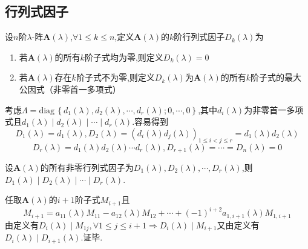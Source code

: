 \subsection{行列式因子}
\begin{formal}
\begin{definition}[行列式因子]\label{def:行列式因子}
    设$n$阶$\lambda$-阵$\bm{A}\left(\lambda\right)$,$\forall 1\leqslant k\leqslant n$,定义$\bm{A}\left(\lambda\right)$的$k$阶行列式因子$D_k\left(\lambda\right)$为
    \begin{enumerate}[label={\textup{(\arabic*)}}]
        \item 若$\bm{A}\left(\lambda\right)$的所有$k$阶子式均为零,则定义$D_k\left(\lambda\right)=0$
        \item 若$\bm{A}\left(\lambda\right)$存在$k$阶子式不为零,则定义$D_k\left(\lambda\right)$为$\bm{A}\left(\lambda\right)$的所有$k$阶子式的最大公因式（非零首一多项式）
    \end{enumerate}
\end{definition}
\end{formal}
\begin{brown}
\begin{example}
    考虑$\bm{\varLambda}=\mathrm{diag}\,\left\{d_1\left(\lambda\right),d_2\left(\lambda\right),\cdots,d_r\left(\lambda\right);0,\cdots,0\right\}$,其中$d_i\left(\lambda\right)$为非零首一多项式且$d_1\left(\lambda\right)\mid d_2\left(\lambda\right)\mid \cdots\mid d_r\left(\lambda\right).$容易得到
    \[
    D_1\left(\lambda\right)=d_1\left(\lambda\right),D_2\left(\lambda\right)=\left(d_i\left(\lambda\right)d_j\left(\lambda\right)\right)_{1\leqslant i<j\leqslant r}=d_1\left(\lambda\right)d_2\left(\lambda\right)
    \]
    \[
    D_r\left(\lambda\right)=d_1\left(\lambda\right)d_2\left(\lambda\right)\cdots d_r\left(\lambda\right),D_{r+1}\left(\lambda\right)=\cdots=D_n\left(\lambda\right)=0
    \]
\end{example}
\end{brown}
\begin{green}
\begin{lemma}[非零行列式因子的整除关系]\label{lem:非零行列式因子的整除关系}
    设$\bm{A}\left(\lambda\right)$的所有非零行列式因子为$D_1\left(\lambda\right),D_2\left(\lambda\right),\cdots,D_r\left(\lambda\right)$,则$D_1\left(\lambda\right)\mid D_2\left(\lambda\right)\mid \cdots\mid D_r\left(\lambda\right)$.
\end{lemma}
\begin{Proof}
任取$\bm{A}\left(\lambda\right)$的$i+1$阶子式$M_{i+1}$且
\[
M_{i+1}=a_{11}\left(\lambda\right)M_{11}-a_{12}\left(\lambda\right)M_{12}+\cdots+\left(-1\right)^{i+2}a_{1,i+1}\left(\lambda\right)M_{1,i+1}
\]由定义有$D_i\left(\lambda\right)\mid M_{1j},\forall 1\leqslant j\leqslant i+1\Longrightarrow
D_i\left(\lambda\right)\mid M_{i+1}$又由定义有$D_{i}\left(\lambda\right)\mid D_{i+1}\left(\lambda\right).$证毕.
\end{Proof}
\end{green}
